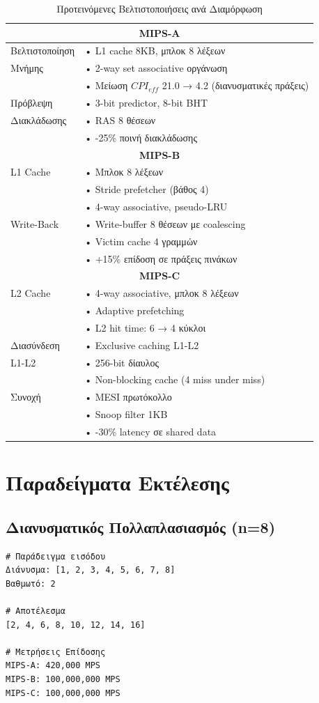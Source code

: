 \documentclass[11pt,a4paper]{article}
\begin{document}
\begin{table}[h]
\centering
\begin{tabular}{|l|p{11cm}|}
\hline
\multicolumn{2}{|c|}{\textbf{MIPS-A}} \\
\hline
Βελτιστοποίηση & • L1 cache 8KB, μπλοκ 8 λέξεων \\
Μνήμης & • 2-way set associative οργάνωση \\
& • Μείωση $CPI_{eff}$ 21.0 → 4.2 (διανυσματικές πράξεις) \\
\hline
Πρόβλεψη & • 3-bit predictor, 8-bit BHT \\
Διακλάδωσης & • RAS 8 θέσεων \\
& • -25\% ποινή διακλάδωσης \\
\hline
\multicolumn{2}{|c|}{\textbf{MIPS-B}} \\
\hline
L1 Cache & • Μπλοκ 8 λέξεων \\
& • Stride prefetcher (βάθος 4) \\
& • 4-way associative, pseudo-LRU \\
\hline
Write-Back & • Write-buffer 8 θέσεων με coalescing \\
& • Victim cache 4 γραμμών \\
& • +15\% επίδοση σε πράξεις πινάκων \\
\hline
\multicolumn{2}{|c|}{\textbf{MIPS-C}} \\
\hline
L2 Cache & • 4-way associative, μπλοκ 8 λέξεων \\
& • Adaptive prefetching \\
& • L2 hit time: 6 → 4 κύκλοι \\
\hline
Διασύνδεση & • Exclusive caching L1-L2 \\
L1-L2 & • 256-bit δίαυλος \\
& • Non-blocking cache (4 miss under miss) \\
\hline
Συνοχή & • MESI πρωτόκολλο \\
& • Snoop filter 1KB \\
& • -30\% latency σε shared data \\
\hline
\end{tabular}
\caption{Προτεινόμενες Βελτιστοποιήσεις ανά Διαμόρφωση}
\end{table}

\section{Παραδείγματα Εκτέλεσης}
\subsection{Διανυσματικός Πολλαπλασιασμός (n=8)}
\begin{lstlisting}[basicstyle=\small]
# Παράδειγμα εισόδου
Διάνυσμα: [1, 2, 3, 4, 5, 6, 7, 8]
Βαθμωτό: 2

# Αποτέλεσμα
[2, 4, 6, 8, 10, 12, 14, 16]

# Μετρήσεις Επίδοσης
MIPS-A: 420,000 MPS
MIPS-B: 100,000,000 MPS
MIPS-C: 100,000,000 MPS
\end{lstlisting}
\end{document}
